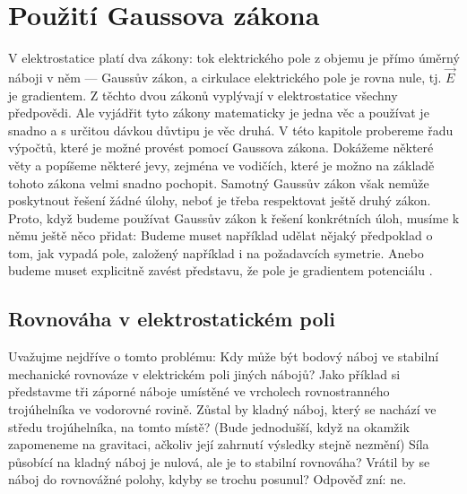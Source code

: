 {
\chapter{Použití Gaussova zákona}\label{fyz:IIchapV}
\minitoc
V elektrostatice platí dva zákony: tok elektrického pole z objemu je přímo úměrný náboji v něm 
— Gaussův zákon, a cirkulace elektrického pole je rovna nule, tj. \(\vec{E}\) je gradientem. Z 
těchto dvou zákonů vyplývají v elektrostatice všechny předpovědi. Ale vyjádřit tyto zákony 
matematicky je jedna věc a používat je snadno a s určitou dávkou důvtipu je věc druhá. V této 
kapitole probereme řadu výpočtů, které je možné provést pomocí Gaussova zákona. Dokážeme 
některé věty a popíšeme některé jevy, zejména ve vodičích, které je možno na základě tohoto 
zákona velmi snadno pochopit. Samotný Gaussův zákon však nemůže poskytnout řešení žádné úlohy, 
neboť je třeba respektovat ještě druhý zákon. Proto, když budeme používat Gaussův zákon k 
řešení konkrétních úloh, musíme k němu ještě něco přidat: Budeme muset například udělat nějaký 
předpoklad o tom, jak vypadá pole, založený například i na požadavcích symetrie. Anebo 
budeme muset explicitně zavést představu, že pole je gradientem potenciálu 
\cite[s.~82]{Feynman02}.

\section{Rovnováha v elektrostatickém poli}\label{fyz:IIchapVsecI}
  Uvažujme nejdříve o tomto problému: Kdy může být bodový náboj ve stabilní mechanické 
  rovnováze v elektrickém poli jiných nábojů? Jako příklad si představme tři záporné náboje 
  umístěné ve vrcholech rovnostranného trojúhelníka ve vodorovné rovině. Zůstal by kladný 
  náboj, který se nachází ve středu trojúhelníka, na tomto místě? (Bude jednodušší, když na 
  okamžik zapomeneme na gravitaci, ačkoliv její zahrnutí výsledky stejně nezmění) Síla působící 
  na kladný náboj je nulová, ale je to stabilní rovnováha? Vrátil by se náboj do rovnovážné 
  polohy, kdyby se trochu posunul? Odpověď zní: ne.
  
}
